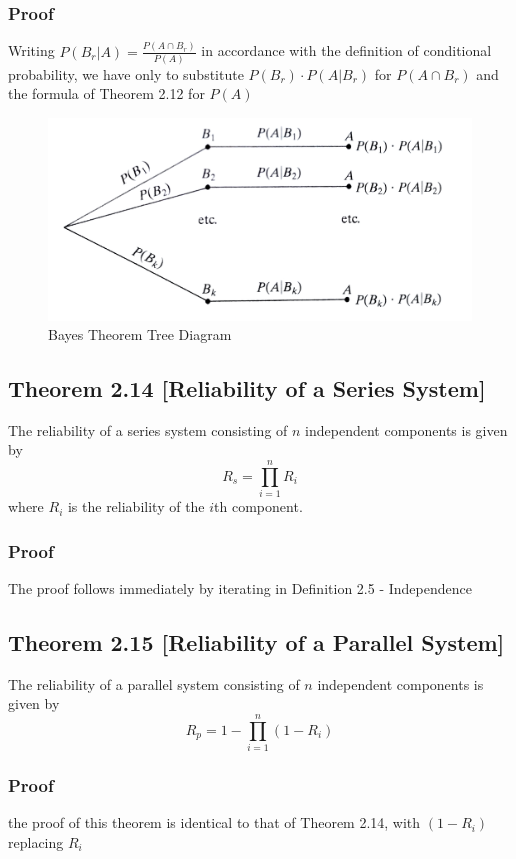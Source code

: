 \documentclass{article}
\begin{document}
\newpage
\subsubsection*{Proof}
Writing \(P(B_r|A) = \frac{P(A \cap B_r)}{P(A)}\) in accordance with the definition of conditional probability, we have only to substitute \(P(B_r) \cdot P(A|B_r)\) for \(P(A \cap B_r)\) and the formula of Theorem 2.12 for \(P(A)\)
\begin{figure}[h]
\includegraphics[width=1\textwidth]{BayesTheoremTreeDiagram}
\caption{Bayes Theorem Tree Diagram}
\label{fig:BayesTree}
\end{figure}

\subsection*{Theorem 2.14 [Reliability of a Series System]}
The reliability of a series system consisting of \(n\) independent components is given by 
\[R_s = \prod_{i=1}^n R_i\]
where \(R_i\) is the reliability of the \(i\)th component.

\subsubsection*{Proof}
The proof follows immediately by iterating in Definition 2.5 - Independence

\subsection*{Theorem 2.15 [Reliability of a Parallel System]}
The reliability of a parallel system consisting of \(n\) independent components is given by
\[R_p = 1 - \prod^n_{i=1} (1-R_i)\]

\subsubsection*{Proof}
the proof of this theorem is identical to that of Theorem 2.14, with \((1 - R_i)\) replacing \(R_i\)
\end{document}

